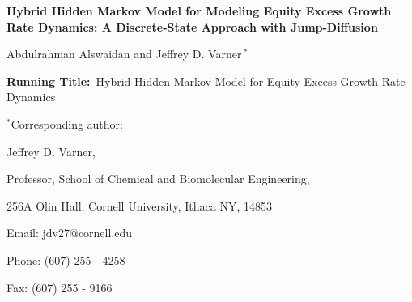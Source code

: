 \documentclass[12pt, letterpaper]{article}
\begin{document}
\begin{titlepage}
{\par\centering\textbf{\Large {Hybrid Hidden Markov Model for Modeling Equity Excess Growth Rate Dynamics: A Discrete-State Approach with Jump-Diffusion}}}
\vspace{0.05in}
{\par \centering \large{Abdulrahman Alswaidan and Jeffrey D. Varner\,$^{*}$}}
\vspace{0.10in}
{\par {}}
{\par {}}
\vspace{0.1in}
{\par \centering \textbf{Running Title:}~Hybrid Hidden Markov Model for Equity Excess Growth Rate Dynamics}
\vspace{0.1in}
\vspace{0.1in}
{\par \centering $^{*}$Corresponding author:}
{\par \centering Jeffrey D. Varner,}
{\par \centering Professor, School of Chemical and Biomolecular Engineering,}
{\par \centering 256A Olin Hall, Cornell University, Ithaca NY, 14853}
{\par \centering Email: jdv27@cornell.edu}
{\par \centering Phone: (607) 255 - 4258}
{\par \centering Fax: (607) 255 - 9166}
\end{titlepage}
\date{}
\thispagestyle{empty}
\pagebreak
\end{document}
